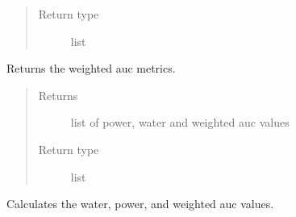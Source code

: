 \documentclass[letterpaper,10pt,english]{sphinxmanual}
\begin{document}
\begin{fulllineitems}
\begin{fulllineitems}
\begin{quote}
\begin{description}
\item[{Return type}] \leavevmode
\sphinxAtStartPar
list

\end{description}\end{quote}

\end{fulllineitems}


\begin{fulllineitems}
\label{\detokenize{apidoc:dreaminsg_integrated_model.src.resilience_metrics.WeightedResilienceMetric.get_weighted_auc_metrics}}
\sphinxAtStartPar
Returns the weighted auc metrics.
\begin{quote}\begin{description}
\item[{Returns}] \leavevmode
\sphinxAtStartPar
list of power, water and weighted auc values

\item[{Return type}] \leavevmode
\sphinxAtStartPar
list

\end{description}\end{quote}

\end{fulllineitems}


\begin{fulllineitems}
\label{\detokenize{apidoc:dreaminsg_integrated_model.src.resilience_metrics.WeightedResilienceMetric.set_weighted_auc_metrics}}
\sphinxAtStartPar
Calculates the water, power, and weighted auc values.

\end{fulllineitems}


\end{fulllineitems}
\end{document}
